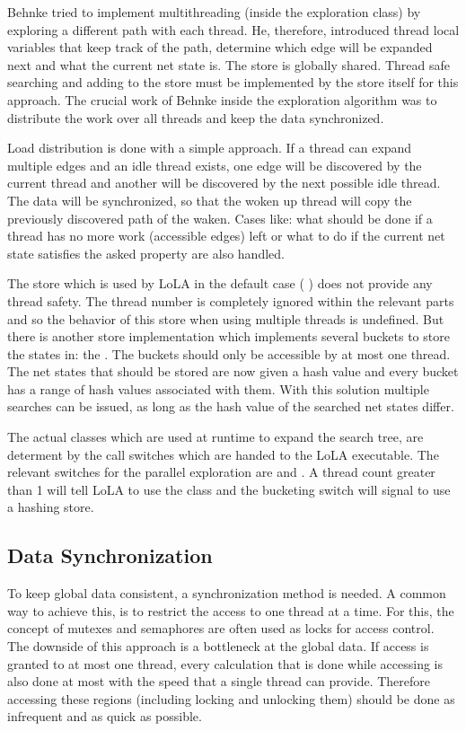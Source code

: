 Behnke tried to implement multithreading (inside the exploration class) by exploring a different path with each thread. He, therefore, introduced thread local variables that keep track of the path, determine which edge will be expanded next and what the current net state is. The store is globally shared. Thread safe searching and adding to the store must be implemented by the store itself for this approach. The crucial work of Behnke inside the exploration algorithm was to distribute the work over all threads and keep the data synchronized.

Load distribution is done with a simple approach. If a thread can expand multiple edges and an idle thread exists, one edge will be discovered by the current thread and another will be discovered by the next possible idle thread. The data will be synchronized, so that the woken up thread will copy the previously discovered path of the waken. Cases like: what should be done if a thread has no more work (accessible edges) left or what to do if the current net state satisfies the asked property are also handled.

The store which is used by LoLA in the default case ( ) does not provide any thread safety. The thread number is completely ignored within the relevant parts and so the behavior of this store when using multiple threads is undefined. But there is another store implementation which implements several buckets to store the states in: the . The buckets should only be accessible by at most one thread. The net states that should be stored are now given a hash value and every bucket has a range of hash values associated with them. With this solution multiple searches can be issued, as long as the hash value of the searched net states differ.

The actual classes which are used at runtime to expand the search tree, are determent by the call switches which are handed to the LoLA executable. The relevant switches for the parallel exploration are  and . A thread count greater than 1 will tell LoLA to use the  class and the bucketing switch will signal to use a hashing store.

\subsection{Data Synchronization}
To keep global data consistent, a synchronization method is needed. A common way to achieve this, is to restrict the access to one thread at a time. For this, the concept of mutexes and semaphores are often used as locks for access control. The downside of this approach is a bottleneck at the global data. If access is granted to at most one thread, every calculation that is done while accessing is also done at most with the speed that a single thread can provide. Therefore accessing these regions (including locking and unlocking them) should be done as infrequent and as quick as possible.


